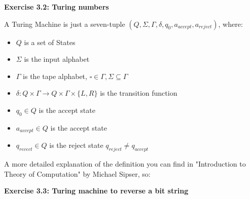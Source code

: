 \documentclass{article}
\begin{document}
\begin{framed}
    \noindent \textbf{Exercise 3.2: Turing numbers}
    
    \medskip
    A Turing Machine is just a seven-tuple $(Q, \Sigma, \Gamma, \delta, q_0, a_{accept}, a_{reject})$, where:
    \begin{itemize}
        \item $Q$ is a set of States
        \item $\Sigma$ is the input alphabet 
        \item $\Gamma$ is the tape alphabet, $\square \in \Gamma, \Sigma \subseteq \Gamma$
        \item $\delta: Q \times \Gamma \rightarrow Q \times \Gamma \times \{L,R\}$ is the transition function
        \item  $q_0 \in Q$ is the accept state
        \item $a_{accept} \in Q$ is the accept state
        \item $q_{recect} \in Q$ is the reject state $q_{reject} \neq q_{accept}$
    \end{itemize}
A more detailed explanation of the definition you can find in "Introduction to Theory of Computation" by Michael Sipser, so:
\end{framed}

\bigskip

\begin{framed}
    \noindent \textbf{Exercise 3.3: Turing machine to reverse a bit string}
    
    \medskip
    
    
\end{framed}

\bigskip
\end{document}
